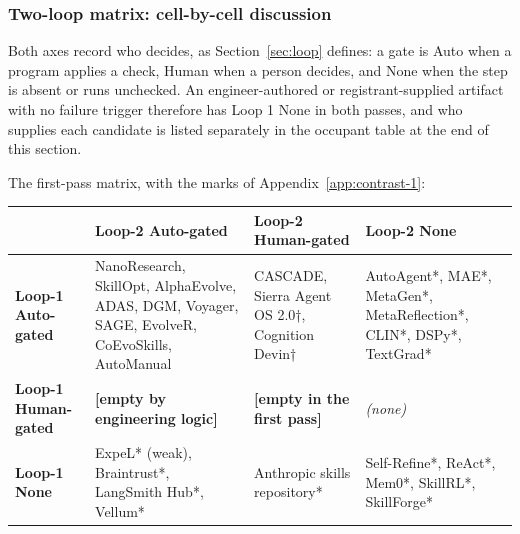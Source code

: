 \documentclass[
  11pt,
]{article}
\newcounter{none} %
\begin{document}
\subsubsection{Two-loop matrix: cell-by-cell discussion}\label{app:contrast-2-1}

Both axes record who decides, as Section~\ref{sec:loop} defines: a gate is Auto when a program applies a check, Human when a person decides, and None when the step is absent or runs unchecked. An engineer-authored or registrant-supplied artifact with no failure trigger therefore has Loop 1 None in both passes, and who supplies each candidate is listed separately in the occupant table at the end of this section.

The first-pass matrix, with the marks of Appendix~\ref{app:contrast-1}:

{\def\LTcaptype{none} %
\begin{longtable}[]{@{}
  >{\raggedright\arraybackslash}p{}
  >{\raggedright\arraybackslash}p{}
  >{\raggedright\arraybackslash}p{}
  >{\raggedright\arraybackslash}p{}@{}}
\toprule\noalign{}
\begin{minipage}[b]{\linewidth}\raggedright
\end{minipage} & \begin{minipage}[b]{\linewidth}\raggedright
\textbf{Loop-2 Auto-gated}
\end{minipage} & \begin{minipage}[b]{\linewidth}\raggedright
\textbf{Loop-2 Human-gated}
\end{minipage} & \begin{minipage}[b]{\linewidth}\raggedright
\textbf{Loop-2 None}
\end{minipage} \\
\midrule\noalign{}
\endhead
\bottomrule\noalign{}
\endlastfoot
\textbf{Loop-1 Auto-gated} & NanoResearch, SkillOpt, AlphaEvolve, ADAS, DGM, Voyager, SAGE, EvolveR, CoEvoSkills, AutoManual & CASCADE, Sierra Agent OS 2.0†, Cognition Devin† & AutoAgent*, MAE*, MetaGen*, MetaReflection*, CLIN*, DSPy*, TextGrad* \\
\textbf{Loop-1 Human-gated} & \textbf{{[}empty by engineering logic{]}} & \textbf{{[}empty in the first pass{]}} & \emph{(none)} \\
\textbf{Loop-1 None} & ExpeL* (weak), Braintrust*, LangSmith Hub*, Vellum* & Anthropic skills repository* & Self-Refine*, ReAct*, Mem0*, SkillRL*, SkillForge* \\
\end{longtable}
}
\end{document}
